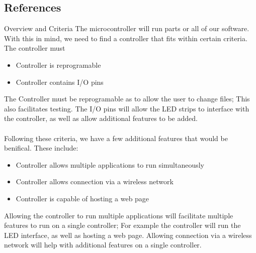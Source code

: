 \documentclass[onecolumn, draftclsnofoot,10pt, compsoc]{IEEEtran}
\begin{document}
\newpage

\tableofcontents
\clearpage
\singlespace


		\subsection{References}

		\begingroup
			\renewcommand{\addcontentsline}[3]{}%
			\renewcommand{\section}[2]{}%

			
			

		\endgroup
		\newpage
	\section{Microcontroller}
		\subsection{Overview and Criteria}
		The microcontroller will run parts or all of our software. With this in mind,
		we need to find a controller that fits within certain criteria. The
		controller must
		\begin{itemize}
			\item Controller is reprogramable
			\item Controller contains I/O pins
		\end{itemize}
		The Controller must be reprogramable as to allow the user to change files;
		This also facilitates testing. The I/O pins will allow the LED strips to
		interface with the controller, as well as allow additional features to be
		added.
		\\\\
		Following these criteria, we have a few additional features that would be
		benifical. These include:
		\begin{itemize}
			\item Controller allows multiple applications to run simultaneously
			\item Controller allows connection via a wireless network
			\item Controller is capable of hosting a web page
		\end{itemize}
		Allowing the controller to run multiple applications will facilitate
		multiple features to run on a single controller; For example the controller
		will run the LED interface, as well as hosting a web page. Allowing
		connection via a wireless network will help with additional features on a
		single controller.
\end{document}
